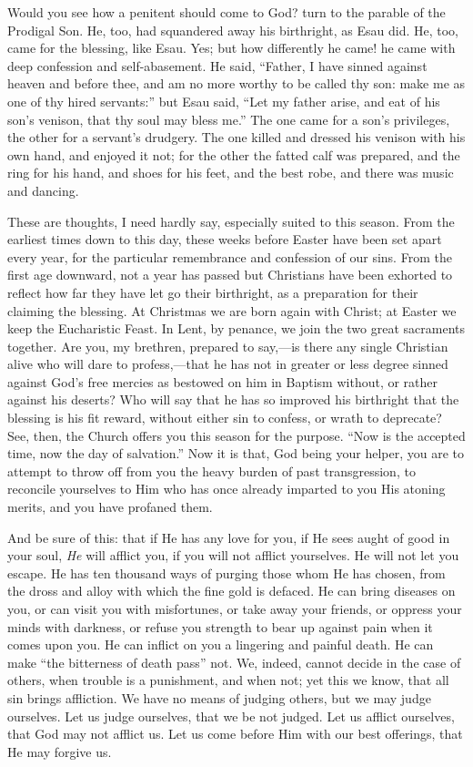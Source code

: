 Would you see how a penitent should come to God? turn to the parable
of the Prodigal Son. He, too, had squandered away his birthright, as
Esau did. He, too, came for the blessing, like Esau. Yes; but how
differently he came! he came with deep confession and self-abasement. He
said, ``Father, I have sinned against heaven and before thee, and am
no more worthy to be called thy son: make me as one of thy hired
servants:'' but Esau said, ``Let my father arise, and eat of his
son's venison, that thy soul may bless me.'' The one came for a
son's privileges, the other for a servant's drudgery. The one killed and
dressed his venison with his own hand, and enjoyed it not; for the other
the fatted calf was prepared, and the ring for his hand, and shoes for
his feet, and the best robe, and there was music and dancing.

These are thoughts, I need hardly say, especially suited to this
season. From the earliest times down to this day, these weeks before
Easter have been set apart every year, for the particular remembrance
and confession of our sins. From the first age downward, not a year has
passed but Christians have been exhorted to reflect how far they have
let go their birthright, as a preparation for their claiming the
blessing. At Christmas we are born again with Christ; at Easter we keep
the Eucharistic Feast. In Lent, by penance, we join the two great
sacraments together. Are you, my brethren, prepared to say,—is there
any single Christian alive who will dare to profess,—that he has not
in greater or less degree sinned against God's free mercies as bestowed
on him in Baptism without, or rather against his deserts? Who will say
that he has so improved his birthright that the blessing is his fit
reward, without either sin to confess, or wrath to deprecate? See, then,
the Church offers you this season for the purpose. ``Now is the
accepted time, now the day of salvation.'' Now it is that, God being
your helper, you are to attempt to throw off from you the heavy burden
of past transgression, to reconcile yourselves to Him who has once
already imparted to you His atoning merits, and you have profaned them.

And be sure of this: that if He has any love for you, if He sees
aught of good in your soul, \emph{He} will afflict you, if you will not
afflict yourselves. He will not let you escape. He has ten thousand ways
of purging those whom He has chosen, from the dross and alloy with which
the fine gold is defaced. He can bring diseases on you, or can visit you
with misfortunes, or take away your friends, or oppress your minds with
darkness, or refuse you strength to bear up against pain when it comes
upon you. He can inflict on you a lingering and painful death. He can
make ``the bitterness of death pass'' not. We, indeed, cannot
decide in the case of others, when trouble is a punishment, and when
not; yet this we know, that all sin brings affliction. We have no means
of judging others, but we may judge ourselves. Let us judge ourselves,
that we be not judged. Let us afflict ourselves, that God may not
afflict us. Let us come before Him with our best offerings, that He may
forgive us.

